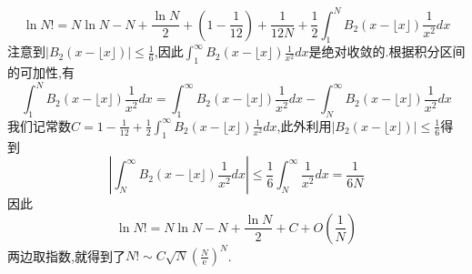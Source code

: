 \documentclass[a4paper,UTF8,12pt]{ctexart}
\begin{document}
$$
 \ln N!= N\ln N - N + \frac{\ln N}{2} +\left(1-\frac{1}{12}\right)+\frac{1}{12N} + \frac{1}{2}\int_1^N B_2(x-\lfloor x \rfloor)\frac{1}{x^2}dx
$$
注意到$|B_2(x-\lfloor x \rfloor)| \leqslant \frac{1}{6}$,因此$\int_1^\infty B_2(x-\lfloor x \rfloor)\frac{1}{x^2}dx$是绝对收敛的.根据积分区间的可加性,有
$$
\int_1^N B_2(x-\lfloor x \rfloor)\frac{1}{x^2}dx=\int_1^\infty B_2(x-\lfloor x \rfloor)\frac{1}{x^2}dx - \int_N^\infty B_2(x-\lfloor x \rfloor)\frac{1}{x^2}dx
$$
我们记常数$C=1-\frac{1}{12}+\frac{1}{2}\int_1^\infty B_2(x-\lfloor x \rfloor)\frac{1}{x^2}dx$,此外利用$|B_2(x-\lfloor x \rfloor)| \leqslant \frac{1}{6}$得到
$$
\left|\int_N^\infty B_2(x-\lfloor x \rfloor)\frac{1}{x^2}dx\right| \leqslant \frac{1}{6} \int_N^\infty \frac{1}{x^2}dx = \frac{1}{6N}
$$
因此
$$
\ln N! = N\ln N - N + \frac{\ln N}{2} + C + O\left(\frac{1}{N}\right)
$$
两边取指数,就得到了$N! \sim C \sqrt{N}\left(\frac{N}{\mathrm{e}}\right)^N$.\par
\end{document}
